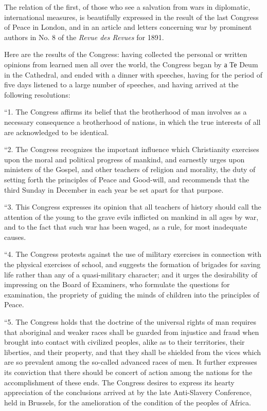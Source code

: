 \documentclass{book}
\begin{document}
The relation of the first, of those who see a salvation from wars in diplomatic, international measures, is beautifully expressed in the result of the last Congress of Peace in London, and in an article and letters concerning war by prominent authors in No. 8 of the \emph{Revue des Revues} for 1891.

Here are the results of the Congress: having collected the personal or written opinions from learned men all over the world, the Congress began by а Те Deum in the Cathedral, and ended with a dinner with speeches, having for the period of five days listened to a large number of speeches, and having arrived at the following resolutions:

“1. The Congress affirms its belief that the brotherhood of man involves as a necessary consequence a brotherhood of nations, in which the true interests of all are acknowledged to be identical.

“2. The Congress recognizes the important influence which Christianity exercises upon the moral and political progress of mankind, and earnestly urges upon ministers of the Gospel, and other teachers of religion and morality, the duty of setting forth the principles of Peace and Good-will, and recommends that the third Sunday in December in each year be set apart for that purpose.

“3. This Congress expresses its opinion that all teachers of history should call the attention of the young to the grave evils inflicted on mankind in all ages by war, and to the fact that such war has been waged, as a rule, for most inadequate causes.

“4. The Congress protests against the use of military exercises in connection with the physical exercises of school, and suggests the formation of brigades for saving life rather than any of a quasi-military character; and it urges the desirability of impressing on the Board of Examiners, who formulate the questions for examination, the propriety of guiding the minds of children into the principles of Peace.

“5. The Congress holds that the doctrine of the universal rights of man requires that aboriginal and weaker races shall be guarded from injustice and fraud when brought into contact with civilized peoples, alike as to their territories, their liberties, and their property, and that they shall be shielded from the vices which are so prevalent among the so-called advanced races of men. It further expresses its conviction that there should be concert of action among the nations for the accomplishment of these ends. The Congress desires to express its hearty appreciation of the conclusions arrived at by the late Anti-Slavery Conference, held in Brussels, for the amelioration of the condition of the peoples of Africa.
\end{document}
